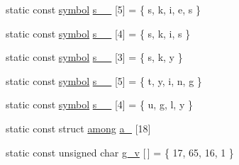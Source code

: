 \begin{DoxyCompactItemize}
\item 
static const \mbox{\hyperlink{namespaceirk_1_1porter2_afd04c4eb58a1dabcf8f3ab2d7e9f9ed5}{symbol}} \mbox{\hyperlink{namespaceirk_1_1porter2_af007d64d58994f033ca88e50df64260a}{s\+\_\+\_}} \mbox{[}5\mbox{]} = \{ \textquotesingle{}s\textquotesingle{}, \textquotesingle{}k\textquotesingle{}, \textquotesingle{}i\textquotesingle{}, \textquotesingle{}e\textquotesingle{}, \textquotesingle{}s\textquotesingle{} \}
\item 
static const \mbox{\hyperlink{namespaceirk_1_1porter2_afd04c4eb58a1dabcf8f3ab2d7e9f9ed5}{symbol}} \mbox{\hyperlink{namespaceirk_1_1porter2_a11965394d890f881bf42e2203f197955}{s\+\_\+\_}} \mbox{[}4\mbox{]} = \{ \textquotesingle{}s\textquotesingle{}, \textquotesingle{}k\textquotesingle{}, \textquotesingle{}i\textquotesingle{}, \textquotesingle{}s\textquotesingle{} \}
\item 
static const \mbox{\hyperlink{namespaceirk_1_1porter2_afd04c4eb58a1dabcf8f3ab2d7e9f9ed5}{symbol}} \mbox{\hyperlink{namespaceirk_1_1porter2_ae49ac1323d41e2aceb5197e8c6318d94}{s\+\_\+\_}} \mbox{[}3\mbox{]} = \{ \textquotesingle{}s\textquotesingle{}, \textquotesingle{}k\textquotesingle{}, \textquotesingle{}y\textquotesingle{} \}
\item 
static const \mbox{\hyperlink{namespaceirk_1_1porter2_afd04c4eb58a1dabcf8f3ab2d7e9f9ed5}{symbol}} \mbox{\hyperlink{namespaceirk_1_1porter2_a8af2bb8d2d0bfbbc87cf6864abdc95ed}{s\+\_\+\_}} \mbox{[}5\mbox{]} = \{ \textquotesingle{}t\textquotesingle{}, \textquotesingle{}y\textquotesingle{}, \textquotesingle{}i\textquotesingle{}, \textquotesingle{}n\textquotesingle{}, \textquotesingle{}g\textquotesingle{} \}
\item 
static const \mbox{\hyperlink{namespaceirk_1_1porter2_afd04c4eb58a1dabcf8f3ab2d7e9f9ed5}{symbol}} \mbox{\hyperlink{namespaceirk_1_1porter2_a782b9afe624f49cfbcf5038f1302b698}{s\+\_\+\_}} \mbox{[}4\mbox{]} = \{ \textquotesingle{}u\textquotesingle{}, \textquotesingle{}g\textquotesingle{}, \textquotesingle{}l\textquotesingle{}, \textquotesingle{}y\textquotesingle{} \}
\item 
static const struct \mbox{\hyperlink{structirk_1_1porter2_1_1among}{among}} \mbox{\hyperlink{namespaceirk_1_1porter2_a1b3ab67c718be923bcf0dcb1d6c5c27f}{a\+\_}} \mbox{[}18\mbox{]}
\item 
static const unsigned char \mbox{\hyperlink{namespaceirk_1_1porter2_a27da03adfd637625df52babe7816c985}{g\+\_\+v}} \mbox{[}$\,$\mbox{]} = \{ 17, 65, 16, 1 \}
\item 

\end{DoxyCompactItemize}
